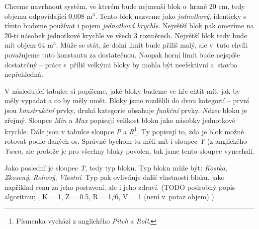 Chceme navrhnout systém, ve kterém bude nejmenší blok o~hraně 20 cm, tedy objemu odpovídající 0,008 m$^3$. Tento blok nazveme jako \textit{jednotkový}, identicky s tímto budeme používat i pojem \textit{jednotková krychle}. Největší blok pak omezíme na 20-ti násobek jednotkové krychle ve všech 3 rozměrech. Největší blok tedy bude mít objem 64 m$^3$. Může se stát, že dolní limit bude příliš malý, ale v~tuto chvíli považujeme tuto konstantu za dostatečnou. Naopak horní limit bude nejspíše dostatečný -- práce s~příliš velkými bloky by mohla být neefektivní a~stavba nepřehledná.

V následující tabulce si popíšeme, jaké bloky budeme ve hře chtít mít, jak by měly vypadat a co by měly umět. Bloky jsme rozdělili do dvou kategorií -- první jsou \textit{konstrukční} prvky, druhá kategorie obsahuje \textit{funkční} prvky. \textit{Název} bloku je zřejmý. Sloupce \textit{Min} a \textit{Max} popisují velikost bloku jako násobky jednotkové krychle. Dále jsou v tabulce sloupce \textit{P} a \textit{R}\footnote{Písmenka vychází z anglického \textit{Pitch} a \textit{Roll}. }. Ty popisují to, zda je blok možné rotovat podle daných os. Správně bychom tu měli mít i sloupec \textit{Y} (z anglického \textit{Yawn}, ale protože je pro všechny bloky povolen, tak jsme tento sloupec vynechali. 


Jako poslední je sloupec \textit{T}, tedy typ bloku. Typ bloku může být: \textit{Kostka}, \textit{Zkosený}, \textit{Rohový}, \textit{Vlastní}. Typ pak ovlivňuje další vlastnosti bloku, jako například cenu za jeho postavení, ale i jeho zdraví. (TODO podrobný popis algoritmu; , K = 1, Z = 0.5, R = 1/6, V = 1 (není v~potaz objem) )


